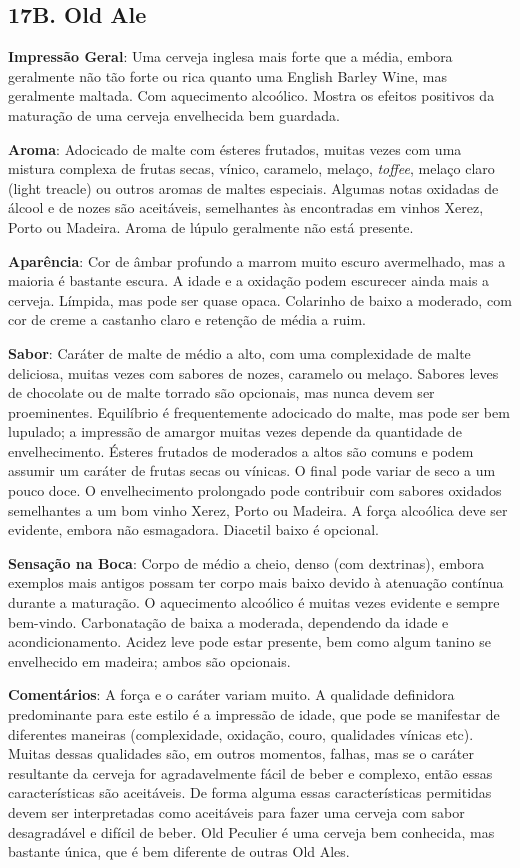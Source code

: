 \subsection*{17B. Old Ale}
\textbf{Impressão Geral}: Uma cerveja inglesa mais forte que a média, embora geralmente não tão forte ou rica quanto uma English Barley Wine, mas geralmente maltada. Com aquecimento alcoólico. Mostra os efeitos positivos da maturação de uma cerveja envelhecida bem guardada.

\textbf{Aroma}: Adocicado de malte com ésteres frutados, muitas vezes com uma mistura complexa de frutas secas, vínico, caramelo, melaço, \textit{toffee}, melaço claro (light treacle) ou outros aromas de maltes especiais. Algumas notas oxidadas de álcool e de nozes são aceitáveis, semelhantes às encontradas em vinhos Xerez, Porto ou Madeira. Aroma de lúpulo geralmente não está presente.

\textbf{Aparência}: Cor de âmbar profundo a marrom muito escuro avermelhado, mas a maioria é bastante escura. A idade e a oxidação podem escurecer ainda mais a cerveja. Límpida, mas pode ser quase opaca. Colarinho de baixo a moderado, com cor de creme a castanho claro e retenção de média a ruim.

\textbf{Sabor}: Caráter de malte de médio a alto, com uma complexidade de malte deliciosa, muitas vezes com sabores de nozes, caramelo ou melaço. Sabores leves de chocolate ou de malte torrado são opcionais, mas nunca devem ser proeminentes. Equilíbrio é frequentemente adocicado do malte, mas pode ser bem lupulado; a impressão de amargor muitas vezes depende da quantidade de envelhecimento. Ésteres frutados de moderados a altos são comuns e podem assumir um caráter de frutas secas ou vínicas. O final pode variar de seco a um pouco doce. O envelhecimento prolongado pode contribuir com sabores oxidados semelhantes a um bom vinho Xerez, Porto ou Madeira. A força alcoólica deve ser evidente, embora não esmagadora. Diacetil baixo é opcional.

\textbf{Sensação na Boca}: Corpo de médio a cheio, denso (com dextrinas), embora exemplos mais antigos possam ter corpo mais baixo devido à atenuação contínua durante a maturação. O aquecimento alcoólico é muitas vezes evidente e sempre bem-vindo. Carbonatação de baixa a moderada, dependendo da idade e acondicionamento. Acidez leve pode estar presente, bem como algum tanino se envelhecido em madeira; ambos são opcionais.

\textbf{Comentários}: A força e o caráter variam muito. A qualidade definidora predominante para este estilo é a impressão de idade, que pode se manifestar de diferentes maneiras (complexidade, oxidação, couro, qualidades vínicas etc). Muitas dessas qualidades são, em outros momentos, falhas, mas se o caráter resultante da cerveja for agradavelmente fácil de beber e complexo, então essas características são aceitáveis. De forma alguma essas características permitidas devem ser interpretadas como aceitáveis para fazer uma cerveja com sabor desagradável e difícil de beber. Old Peculier é uma cerveja bem conhecida, mas bastante única, que é bem diferente de outras Old Ales.

